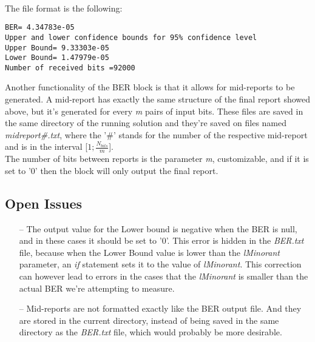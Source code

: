 \begin{refsection}
\\
The file format is the following:
\begin{adjustwidth}{1.5cm}{}
\begin{verbatim}
BER= 4.34783e-05
Upper and lower confidence bounds for 95% confidence level
Upper Bound= 9.33303e-05
Lower Bound= 1.47979e-05
Number of received bits =92000
\end{verbatim}
\end{adjustwidth}
Another functionality of the BER block is that it allows for mid-reports to be generated. A mid-report has exactly the same structure of the final report showed above, but it's generated for every \textit{m} pairs of input bits. These files are saved in the same directory of the running solution and they're saved on files named \textit{midreport\#.txt}, where the '\#' stands for the number of the respective mid-report and is in the interval [$1;\frac{N_{bits}}{m}$].
\\
The number of bits between reports is the parameter \textit{m}, customizable, and if it is set to '0' then the block will only output the final report.

\subsection*{Open Issues}
\begin{itemize}
  \item[--] The output value for the Lower bound is negative when the BER is null, and in these cases it should be set to '0'. This error is hidden in the \textit{BER.txt} file, because when the Lower Bound value is lower than the \textit{lMinorant} parameter, an \textit{if} statement sets it to the value of \textit{lMinorant}. This correction can however lead to errors in the cases that the \textit{lMinorant} is smaller than the actual BER we're attempting to measure.

  \item[--] Mid-reports are not formatted exactly like the BER output file. And they are stored in the current directory, instead of being saved in the same directory as the \textit{BER.txt} file, which would probably be more desirable.
\end{itemize}


\end{refsection}
